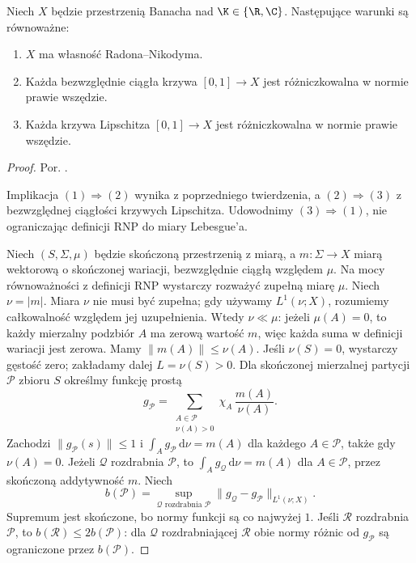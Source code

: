 \begin{twierdzenie}
\label{thm:rnp-lipschitz15b}
Niech $X$ będzie przestrzenią Banacha nad $\K\in\{\R,\C\}$.
Następujące warunki są równoważne:
\begin{enumerate}
 \item $X$ ma własność Radona--Nikodyma.
 \item Każda bezwzględnie ciągła krzywa $[0,1]\to X$
 jest różniczkowalna w normie prawie wszędzie.
 \item Każda krzywa Lipschitza $[0,1]\to X$
 jest różniczkowalna w normie prawie wszędzie.
\end{enumerate}
\end{twierdzenie}
\begin{proof}
Por. .

Implikacja $(1)\Rightarrow(2)$ wynika z poprzedniego
twierdzenia, a $(2)\Rightarrow(3)$ z bezwzględnej
ciągłości krzywych Lipschitza.
Udowodnimy $(3)\Rightarrow(1)$, nie ograniczając
definicji RNP do miary Lebesgue'a.

Niech $(S,\Sigma,\mu)$ będzie skończoną przestrzenią
z miarą, a $m:\Sigma\to X$ miarą wektorową o skończonej
wariacji, bezwzględnie ciągłą względem $\mu$.
Na mocy równoważności z definicji RNP wystarczy
rozważyć zupełną miarę $\mu$. Niech $\nu=|m|$.
Miara $\nu$ nie musi być zupełna; gdy używamy
$L^1(\nu;X)$, rozumiemy całkowalność względem jej
uzupełnienia. Wtedy $\nu\ll\mu$: jeżeli $\mu(A)=0$,
to każdy mierzalny podzbiór $A$ ma zerową wartość
$m$, więc każda suma w definicji wariacji jest zerowa.
Mamy $\|m(A)\|\le\nu(A)$. Jeśli $\nu(S)=0$, wystarczy
gęstość zero; zakładamy dalej $L=\nu(S)>0$.
Dla skończonej mierzalnej partycji $\mathcal P$ zbioru $S$
określmy funkcję prostą
\[
 g_{\mathcal P}=\sum_{\substack{A\in\mathcal P\\\nu(A)>0}}
 \chi_A\,\frac{m(A)}{\nu(A)}.
\]
Zachodzi $\|g_{\mathcal P}(s)\|\le1$ i
$\int_A g_{\mathcal P}\,\mathrm d\nu=m(A)$ dla
każdego $A\in\mathcal P$, także gdy $\nu(A)=0$.
Jeżeli $\mathcal Q$ rozdrabnia $\mathcal P$, to
$\int_A g_{\mathcal Q}\,\mathrm d\nu=m(A)$ dla
$A\in\mathcal P$, przez skończoną addytywność $m$.
Niech
\[
 b(\mathcal P)=
 \sup_{\mathcal Q\text{ rozdrabnia }\mathcal P}
 \|g_{\mathcal Q}-g_{\mathcal P}\|_{L^1(\nu;X)}.
\]
Supremum jest skończone, bo normy funkcji są co najwyżej
$1$. Jeśli $\mathcal R$ rozdrabnia $\mathcal P$, to
$b(\mathcal R)\le2b(\mathcal P)$: dla $\mathcal Q$
rozdrabniającej $\mathcal R$ obie normy różnic od
$g_{\mathcal P}$ są ograniczone przez $b(\mathcal P)$.


\end{proof}

